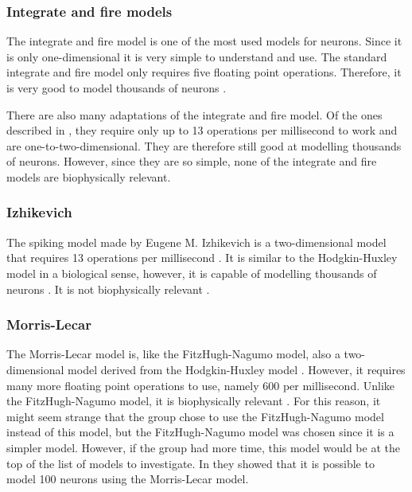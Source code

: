 \documentclass[class={myRUCProject}, crop=false]{standalone}
\begin{document}
\subsubsection*{Integrate and fire models}
The integrate and fire model is one of the most used models for neurons. Since it is only one-dimensional it is very simple to understand and use. The standard integrate and fire model only requires five floating point operations. Therefore, it is very good to model thousands of neurons \cite{Izhikevich2004}.

There are also many adaptations of the integrate and fire model. Of the ones described in \cite{Izhikevich2004}, they require only up to 13 operations per millisecond to work and are one-to-two-dimensional. They are therefore still good at modelling thousands of neurons. However, since they are so simple, none of the integrate and fire models are biophysically relevant.

\subsubsection*{Izhikevich}
The spiking model made by Eugene M. Izhikevich is a two-dimensional model that requires 13 operations per millisecond \cite{Izhikevich2004}. It is similar to the Hodgkin-Huxley model in a biological sense, however, it is capable of modelling thousands of neurons \cite{Muni2022}. It is not biophysically relevant \cite{Izhikevich2004}.

\subsubsection*{Morris-Lecar}
The Morris-Lecar model is, like the FitzHugh-Nagumo model, also a two-dimensional model derived from the Hodgkin-Huxley model \cite{Baladron2012}. However, it requires many more floating point operations to use, namely 600 per millisecond. Unlike the FitzHugh-Nagumo model, it is biophysically relevant \cite{Izhikevich2004}. For this reason, it might seem strange that the group chose to use the FitzHugh-Nagumo model instead of this model, but the FitzHugh-Nagumo model was chosen since it is a simpler model. However, if the group had more time, this model would be at the top of the list of models to investigate. In \cite{kasatkin2015transient} they showed that it is possible to model 100 neurons using the Morris-Lecar model.
\end{document}
